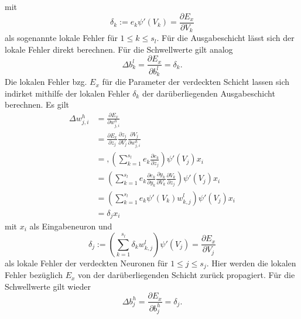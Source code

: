 mit 
\begin{equation*}
    \label{eq:delta_out}
    \delta_k:= e_k \psi'(V_k)=\frac{\partial E_x}{\partial V_k}
\end{equation*}
als sogenannte lokale Fehler für $1 \leq k \leq s_l$. Für die Ausgabeschicht lässt sich der lokale Fehler direkt berechnen.
Für die Schwellwerte gilt analog
\begin{equation*}
    \Delta b_k^l =  \frac{\partial E_x}{\partial b_{k}^l} 
                 =  \delta_k.
\end{equation*}
Die lokalen Fehler bzg. $E_x$ für die Parameter der verdeckten Schicht lassen sich indirket mithilfe der lokalen Fehler $\delta_k$ der darüberliegenden Ausgabeschicht berechnen. Es gilt
\begin{align*}
    \Delta w_{j,i}^h &= \frac{\partial E_x}{\partial w_{j,i}^h} \\
                     &= \frac{\partial E_x}{\partial z_{j}}
                            \frac{\partial z_j}{\partial V_j} 
                            \frac{\partial V_j}{\partial w_{j,i}^h} \\
                    &= ,\left( \sum_{k=1}^{s_l} e_k \frac{\partial e_k}{\partial z_j}\right) \psi'(V_j) x_i \\
                    &= \left( \sum_{k=1}^{s_l} e_k \frac{\partial e_k}{\partial y_k} \frac{\partial y_k}{\partial V_k} \frac{\partial V_k}{\partial z_j}\right) \psi'(V_j) x_i \\
                    &= \left( \sum_{k=1}^{s_l} e_k \psi'(V_k) w_{k,j}^l \right) \psi'(V_j) x_i \\
                    &=  \delta_j x_i
\end{align*}
mit $x_i$ als Eingabeneuron und
\begin{equation*}
    \label{eq:delta_hidden}
    \delta_j:= \left(\sum_{k=1}^{s_l} \delta_k w_{k,j}^l\right) \psi'(V_j)=\frac{\partial E_x}{\partial V_j}
\end{equation*}
als lokale Fehler der verdeckten Neuronen für $1 \leq j \leq s_j$. Hier werden die lokalen Fehler bezüglich $E_x$ von der darüberliegenden Schicht zurück propagiert.
Für die Schwellwerte gilt wieder
\begin{equation*}
    \Delta b_j^h =  \frac{\partial E_x}{\partial b_{j}^h} 
                 =  \delta_j.
\end{equation*}

